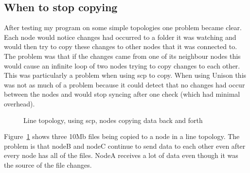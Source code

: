 \documentclass[12pt]{article}
\begin{document}
\subsection{When to stop copying}
After testing my program on some simple topologies one problem became
clear. Each node would notice changes had occurred to a folder
it was watching and would then try to copy these changes to other
nodes that it was connected to. The problem was that if the changes
came from one of its neighbour nodes this would cause an infinite loop
of two nodes trying to copy changes to each other. This was particularly 
a problem when using scp to copy. When using Unison this was not as much of
a problem because it could detect that no changes had occur between the nodes
and would stop syncing after one check (which had minimal overhead).

\begin{figure}[htp]
    \caption{Line topology, using scp, nodes copying data back and forth}
    \label{fig:line_scp_back_forth_graph}
\end{figure}

Figure~\ref{fig:line_scp_back_forth_graph} shows three 10Mb files being copied to a node
in a line topology. The problem is that nodeB and nodeC continue to send
data to each other even after every node has all of the files. NodeA receives
a lot of data even though it was the source of the file changes. 
\end{document}
